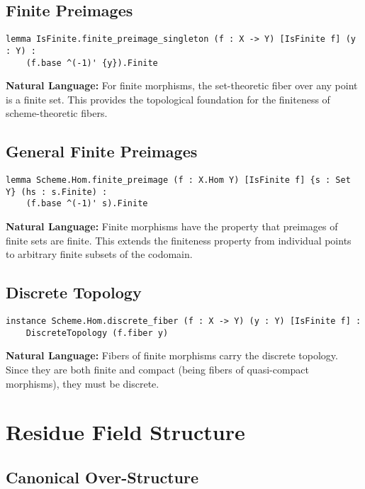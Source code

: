 \documentclass{article}
\theoremstyle{definition}
\begin{document}
\subsection{Finite Preimages}

\begin{lstlisting}
lemma IsFinite.finite_preimage_singleton (f : X -> Y) [IsFinite f] (y : Y) :
    (f.base ^(-1)' {y}).Finite
\end{lstlisting}

\textbf{Natural Language:} For finite morphisms, the set-theoretic fiber over any point is a finite set. This provides the topological foundation for the finiteness of scheme-theoretic fibers.

\subsection{General Finite Preimages}

\begin{lstlisting}
lemma Scheme.Hom.finite_preimage (f : X.Hom Y) [IsFinite f] {s : Set Y} (hs : s.Finite) :
    (f.base ^(-1)' s).Finite
\end{lstlisting}

\textbf{Natural Language:} Finite morphisms have the property that preimages of finite sets are finite. This extends the finiteness property from individual points to arbitrary finite subsets of the codomain.

\subsection{Discrete Topology}

\begin{lstlisting}
instance Scheme.Hom.discrete_fiber (f : X -> Y) (y : Y) [IsFinite f] :
    DiscreteTopology (f.fiber y)
\end{lstlisting}

\textbf{Natural Language:} Fibers of finite morphisms carry the discrete topology. Since they are both finite and compact (being fibers of quasi-compact morphisms), they must be discrete.

\section{Residue Field Structure}

\subsection{Canonical Over-Structure}
\end{document}
